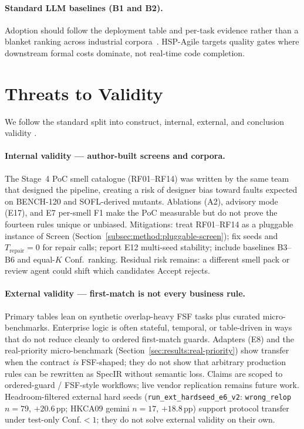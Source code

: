 \paragraph{Standard LLM baselines (B1 and B2).}
Adoption should follow the deployment table and per-task evidence rather than
a blanket ranking across industrial corpora~\citep{dakhel2023copilot,chen2021codex}.
HSP-Agile targets quality gates where downstream formal costs dominate, not
real-time code completion.


\section{Threats to Validity}
\label{sec:disc:threats}

We follow the standard split into construct, internal, external, and
conclusion validity
\cite{ammann2016testing,wohlin2012experimentation}.

\paragraph{Internal validity --- author-built screens and corpora.}
The Stage~4 PoC smell catalogue (RF01--RF14) was written by the same team that
designed the pipeline, creating a risk of designer bias toward faults expected
on BENCH-120 and SOFL-derived mutants.
Ablations (A2), advisory mode (E17), and E7 per-smell F1 make the PoC
measurable but do not prove the fourteen rules unique or unbiased.
Mitigations: treat RF01--RF14 as a pluggable instance of $\mathrm{Screen}$
(Section~\ref{subsec:method:pluggable-screen}); fix seeds and
$T_\text{repair}{=}0$ for repair calls; report E12 multi-seed stability;
include baselines B3--B6 and equal-$K$ Conf.\ ranking.
Residual risk remains: a different smell pack or review agent could shift
which candidates Accept rejects.

\paragraph{External validity --- first-match is not every business rule.}
Primary tables lean on synthetic overlap-heavy FSF tasks plus curated
micro-benchmarks.
Enterprise logic is often stateful, temporal, or table-driven in ways that do
not reduce cleanly to ordered first-match guards.
Adapters (E8) and the real-priority micro-benchmark
(Section~\ref{sec:results:real-priority}) show transfer when the contract
\emph{is} FSF-shaped; they do not show that arbitrary production rules can be
rewritten as SpecIR without semantic loss.
Claims are scoped to ordered-guard / FSF-style workflows; live vendor
replication remains future work.
Headroom-filtered external hard seeds
(\texttt{run\_ext\_hardseed\_e6\_v2}: \texttt{wrong\_relop} $n{=}79$,
${+}20.6$\,pp; HKCA09 gemini $n{=}17$, ${+}18.8$\,pp) support protocol transfer
under test-only Conf.${<}1$; they do not solve external validity on their own.

